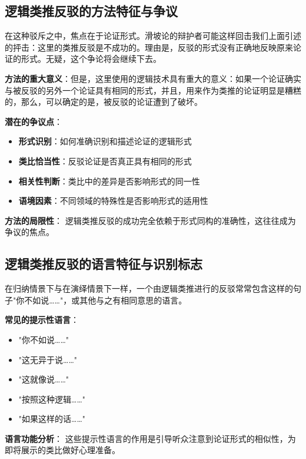 \subsection{逻辑类推反驳的方法特征与争议}

\begin{theorembox}[title=方法的核心特征与潜在争议]
在这种驳斥之中，焦点在于论证形式。滑坡论的辩护者可能这样回击我们上面引述的抨击：这里的类推反驳是不成功的。理由是，反驳的形式没有正确地反映原来论证的形式。无疑，这个争论将会继续下去。

\textbf{方法的重大意义}：但是，这里使用的逻辑技术具有重大的意义：如果一个论证确实与被反驳的另外一个论证具有相同的形式，并且，用来作为类推的论证明显是糟糕的，那么，可以确定的是，被反驳的论证遭到了破坏。

\textbf{潜在的争议点}：
\begin{itemize}
\item \textbf{形式识别}：如何准确识别和描述论证的逻辑形式
\item \textbf{类比恰当性}：反驳论证是否真正具有相同的形式
\item \textbf{相关性判断}：类比中的差异是否影响形式的同一性
\item \textbf{语境因素}：不同领域的特殊性是否影响形式的适用性
\end{itemize}

\textbf{方法的局限性}：
逻辑类推反驳的成功完全依赖于形式同构的准确性，这往往成为争议的焦点。
\end{theorembox}

\subsection{逻辑类推反驳的语言特征与识别标志}

\begin{theorembox}[title=逻辑类推反驳的语言标志]
在归纳情景下与在演绎情景下一样，一个由逻辑类推进行的反驳常常包含这样的句子"你不如说……"，或其他与之有相同意思的语言。

\textbf{常见的提示性语言}：
\begin{itemize}
\item "你不如说……"
\item "这无异于说……"
\item "这就像说……"
\item "按照这种逻辑……"
\item "如果这样的话……"
\end{itemize}

\textbf{语言功能分析}：
这些提示性语言的作用是引导听众注意到论证形式的相似性，为即将展示的类比做好心理准备。
\end{theorembox}

